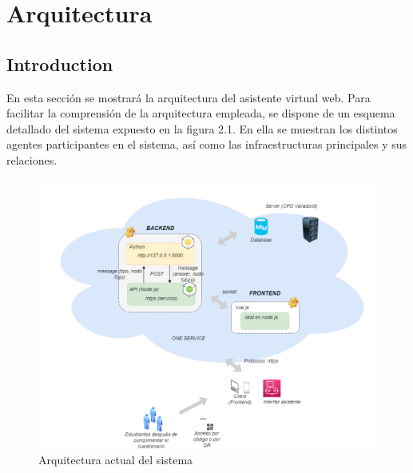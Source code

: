 \chapter{Arquitectura}
\label{chap:architecture}



\section{Introduction}

En esta sección se mostrará la arquitectura del asistente virtual web. Para facilitar la comprensión de la arquitectura empleada, se dispone de un esquema detallado del sistema expuesto en la figura 2.1. En ella se muestran los distintos agentes participantes en el sistema, así como las infraestructuras principales y sus relaciones.



\begin{figure}[h]
\includegraphics[width=\textwidth]{figures/ArquitecturaDPS.png}
\caption{Arquitectura actual del sistema}
\label{fig:architecture}
\end{figure}




